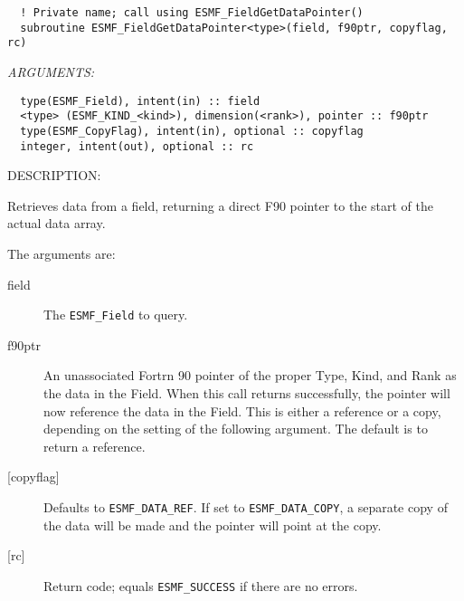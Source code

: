   
\begin{verbatim}  ! Private name; call using ESMF_FieldGetDataPointer() 
  subroutine ESMF_FieldGetDataPointer<type>(field, f90ptr, copyflag, rc) 
   \end{verbatim}{\em ARGUMENTS:}
\begin{verbatim}  type(ESMF_Field), intent(in) :: field 
  <type> (ESMF_KIND_<kind>), dimension(<rank>), pointer :: f90ptr 
  type(ESMF_CopyFlag), intent(in), optional :: copyflag 
  integer, intent(out), optional :: rc 
   \end{verbatim}
{\sf DESCRIPTION:\\ }

 
   Retrieves data from a field, returning a direct F90 pointer to the start 
   of the actual data array. 
   
   The arguments are: 
   \begin{description} 
   \item[field] 
   The {\tt ESMF\_Field} to query. 
   \item[f90ptr] 
   An unassociated Fortrn 90 pointer of the proper Type, Kind, and Rank as the data 
   in the Field. When this call returns successfully, the pointer will now reference 
   the data in the Field. This is either a reference or a copy, depending on the 
   setting of the following argument. The default is to return a reference. 
   \item[{[copyflag]}] 
   Defaults to {\tt ESMF\_DATA\_REF}. If set to {\tt ESMF\_DATA\_COPY}, a separate 
   copy of the data will be made and the pointer will point at the copy. 
   \item[{[rc]}] 
   Return code; equals {\tt ESMF\_SUCCESS} if there are no errors. 
   \end{description} 
    
